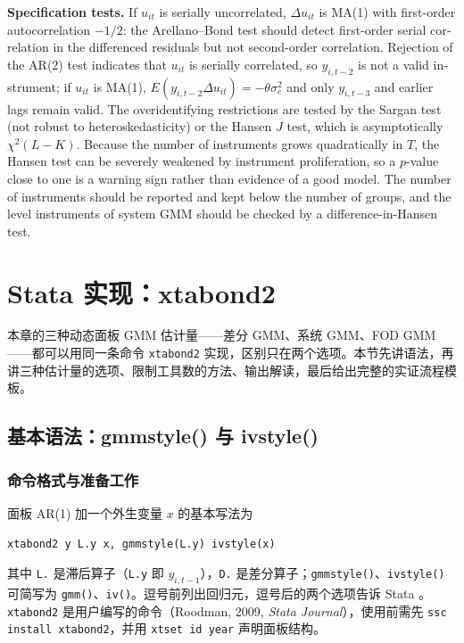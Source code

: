 \begin{english}
\textbf{Specification tests.} If $u_{it}$ is serially uncorrelated, $\Delta u_{it}$ is MA(1) with first-order autocorrelation $-1/2$: the Arellano--Bond test should detect first-order serial correlation in the differenced residuals but not second-order correlation. Rejection of the AR(2) test indicates that $u_{it}$ is serially correlated, so $y_{i,t-2}$ is not a valid instrument; if $u_{it}$ is MA(1), $E(y_{i,t-2}\Delta u_{it})=-\theta\sigma_e^2$ and only $y_{i,t-3}$ and earlier lags remain valid. The overidentifying restrictions are tested by the Sargan test (not robust to heteroskedasticity) or the Hansen $J$ test, which is asymptotically $\chi^2(L-K)$. Because the number of instruments grows quadratically in $T$, the Hansen test can be severely weakened by instrument proliferation, so a $p$-value close to one is a warning sign rather than evidence of a good model. The number of instruments should be reported and kept below the number of groups, and the level instruments of system GMM should be checked by a difference-in-Hansen test.
\end{english}

\section{Stata 实现：xtabond2}\label{sec:U12c-stata}

本章的三种动态面板 GMM 估计量——差分 GMM、系统 GMM、FOD GMM——都可以用同一条命令 \texttt{xtabond2} 实现，区别只在两个选项。本节先讲语法，再讲三种估计量的选项、限制工具数的方法、输出解读，最后给出完整的实证流程模板。

\subsection{基本语法：gmmstyle() 与 ivstyle()}

\subsubsection{命令格式与准备工作}

面板 AR(1) 加一个外生变量 $x$ 的基本写法为
\begin{center}
\texttt{xtabond2 y L.y x, gmmstyle(L.y) ivstyle(x)}
\end{center}
其中 \texttt{L.} 是滞后算子（\texttt{L.y} 即 $y_{i,t-1}$），\texttt{D.} 是差分算子；\texttt{gmmstyle()}、\texttt{ivstyle()} 可简写为 \texttt{gmm()}、\texttt{iv()}。逗号前列出回归元，逗号后的两个选项告诉 Stata 。\texttt{xtabond2} 是用户编写的命令（Roodman, 2009, \emph{Stata Journal}），使用前需先 \texttt{ssc install xtabond2}，并用 \texttt{xtset id year} 声明面板结构。

